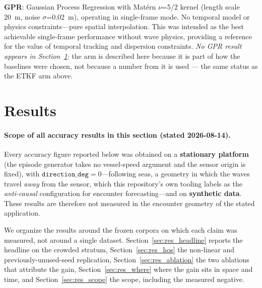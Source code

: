 \documentclass[review]{elsarticle}
\begin{document}
\textbf{GPR}: Gaussian Process Regression with Mat\'{e}rn $\nu$=5/2
kernel (length scale 20~m, noise $\sigma$=0.02~m), operating in
single-frame mode.
No temporal model or physics constraints---pure spatial interpolation.
This was intended as the best achievable single-frame performance without
wave physics, providing a reference for the value of temporal tracking
and dispersion constraints. \emph{No GPR result appears in
Section~\ref{sec:results}}: the arm is described here because it is part of how the
baselines were chosen, not because a number from it is used --- the same status as
the ETKF arm above.

\section{Results}
\label{sec:results}

\paragraph{Scope of all accuracy results in this section (stated 2026-08-14).}
Every accuracy figure reported below was obtained on a \textbf{stationary
platform} (the episode generator takes no vessel-speed argument and the sensor
origin is fixed), with \textbf{$\texttt{direction\_deg}=0$}---following seas, a
geometry in which the waves travel \emph{away} from the sensor, which this
repository's own tooling labels as the \emph{anti-causal} configuration for
encounter forecasting---and on \textbf{synthetic data}. These results are
therefore not measured in the encounter geometry of the stated application.

We organize the results around the frozen corpora on which each claim was
measured, not around a single dataset. Section~\ref{sec:res_headline} reports the headline on the
crowded stratum, Section~\ref{sec:res_hos} the non-linear and previously-unused-seed
replication, Section~\ref{sec:res_ablation} the two ablations that attribute
the gain, Section~\ref{sec:res_where} where the gain sits in space and time,
and Section~\ref{sec:res_scope} the scope, including the measured negative.
\end{document}
